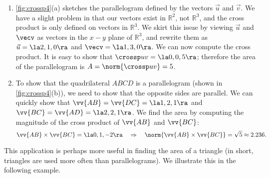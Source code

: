{\begin{enumerate}
	\item \autoref{fig:crossp4}(a) sketches the parallelogram defined by the vectors $\vec u$ and $\vec v$. We have a slight problem in that our vectors exist in $\mathbb{R}^2$, not $\mathbb{R}^3$, and the cross product is only defined on vectors in $\mathbb{R}^3$. We skirt this issue by viewing $\vec u$ and $\vecv$ as vectors in the $x-y$ plane of $\mathbb{R}^3$, and rewrite them as $\vec u = \la 2,1,0\ra$ and $\vecv =\la 1,3,0\ra$. We can now compute the cross product. 
	It is easy to show that $\crossp uv = \la 0,0,5\ra$; therefore the area of the parallelogram is $A = \norm{\crossp uv} = 5$.
	\item		To show that the quadrilateral $ABCD$ is a parallelogram (shown in \autoref{fig:crossp4}(b)), we need to show that the opposite sides are parallel. We can quickly show that $\vv{AB} =\vv{DC} = \la 1,2,1\ra$ and $\vv{BC} = \vv{AD} = \la 2,2,1\ra$. We find the area by computing the magnitude of the cross product of $\vv{AB}$ and $\vv{BC}$:
	$$\vv{AB} \times \vv{BC} = \la 0,1,-2\ra \quad \Rightarrow \quad \norm{\vv{AB}\times\vv{BC}} = \sqrt{5} \approx 2.236.$$
\end{enumerate}}

This application is perhaps more useful in finding the area of a triangle (in short, triangles are used more often than parallelograms). We illustrate this in the following example.

